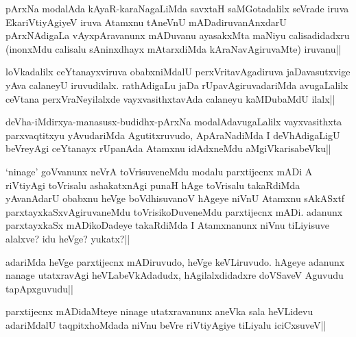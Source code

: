 
\begin{artha}
pArxNa modalAda kAyaR-karaNagaLiMda  savxtaH saMGotadalilx seVrade iruva EkariVtiyAgiyeV iruva Atamxnu tAneVnU mADadiruvanAnxdarU pArxNAdigaLa vAyxpAravanunx mADuvanu ayasakxMta maNiyu calisadidadxru (inonxMdu calisalu sAninxdhayx mAtarxdiMda kAraNavAgiruvaMte) iruvanu||
\end{artha}


\begin{artha}
loVkadalilx ceYtanayxviruva obabxniMdalU perxVritavAgadiruva jaDavasutxvige yAva calaneyU iruvudilalx. rathAdigaLu jaDa rUpavAgiruvadariMda avugaLalilx ceVtana perxVraNeyilalxde vayxvasithxtavAda calaneyu kaMDubaMdU ilalx||
\end{artha}%

\begin{artha}
deVha-iMdirxya-manasusx-budidhx-pArxNa modalAdavugaLalilx vayxvasithxta parxvaqtitxyu yAvudariMda Agutitxruvudo, ApAraNadiMda I deVhAdigaLigU beVreyAgi ceYtanayx rUpanAda Atamxnu idAdxneMdu aMgiVkarisabeVku||
\end{artha}


\begin{artha}
\stext `ninage'  goVvanunx neVrA toVrisuveneMdu modalu parxtijecnx mADi A riVtiyAgi toVrisalu ashakatxnAgi punaH hAge toVrisalu takaRdiMda yAvanAdarU obabxnu heVge boVdhisuvanoV hAgeye niVnU Atamxnu sAkASxtf parxtayxkaSxvAgiruvaneMdu toVrisikoDuveneMdu parxtijecnx mADi. adanunx parxtayxkaSx mADikoDadeye takaRdiMda I Atamxnanunx niVnu tiLiyisuve alalxve? idu heVge? yukatx?|| 
\end{artha}

\begin{artha}%
adariMda heVge parxtijecnx mADiruvudo, heVge keVLiruvudo. hAgeye adanunx nanage utatxravAgi heVLabeVkAdadudx, hAgilalxdidadxre doVSaveV Aguvudu tapApxguvudu||
\end{artha}


\begin{artha}
parxtijecnx mADidaMteye ninage utatxravanunx aneVka sala heVLidevu adariMdalU taqpitxhoMdada niVnu beVre riVtiyAgiye tiLiyalu iciCxsuveV|| 
\end{artha}

